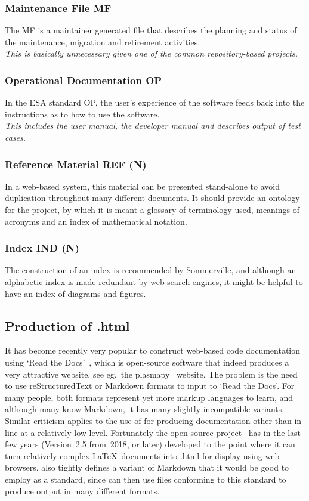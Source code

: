 \subsubsection{Maintenance File MF}\label{sec:MF}
The MF is a maintainer generated file
that describes the planning and status of the maintenance, migration and retirement activities. \\ 
\emph{This is basically unnecessary given one of the common repository-based projects.}
\subsubsection{Operational Documentation OP}\label{sec:OP}
In the ESA standard OP, the user's experience of the software feeds back into the instructions
as to how to use the software. \\ 
\emph{This includes the user manual, the developer manual and describes output of test cases.}
\subsubsection{Reference Material REF (N)}\label{sec:REF}
In a web-based system, this material can be presented stand-alone to avoid duplication throughout
many different documents. It should provide an ontology for the project, by which it is meant
a glossary of terminology used, meanings of acronyms and an index of mathematical notation.
\subsubsection{Index IND (N)}\label{sec:IND}
The construction of an index is recommended by Sommerville, and although an alphabetic index
is made redundant by web search engines, it might be helpful to have an index of diagrams and figures.

\subsection{Production of .html}\label{sec:toweb}
It has become recently very popular to construct web-based code documentation using `Read the
Docs'~\cite{readthedocswebsite}, which is open-source software that indeed
produces a very attractive website, see eg.\ the plasmapy~\cite{plasmapywebsite} website.
The problem is the need to use reStructuredText or Markdown
formats to input to  `Read the Docs'. For many people, both formats represent yet more markup languages to learn, and
although many know Markdown, it has many slightly incompatible variants.
Similar criticism applies to the use of  for producing documentation other
than in-line at a relatively low level.
Fortunately the open-source  project~\cite{pandocwebsite}  has in the last
few years (Version~2.5 from~2018, or later) developed to the point where it can turn relatively complex \LaTeX\ 
documents into .html for display using web browsers.   also tightly defines a variant
of Markdown that it would be good to employ as a standard, since \F{pandoc} can then
use files conforming to this standard to produce output in many different
formats.

